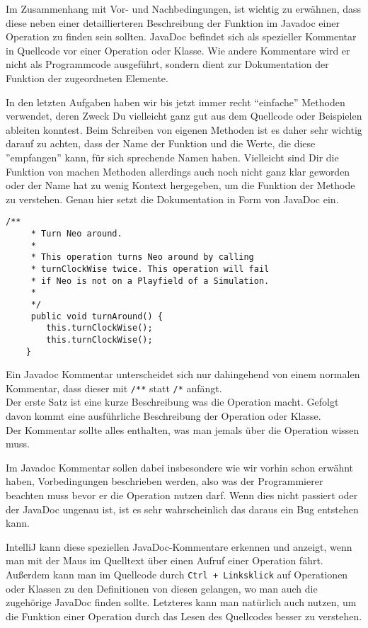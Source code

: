 \begin{Infobox}[JavaDoc]
    Im Zusammenhang mit Vor- und Nachbedingungen, ist wichtig zu erwähnen, dass diese neben einer detaillierteren Beschreibung der Funktion im Javadoc einer Operation zu finden sein sollten.
JavaDoc befindet sich als spezieller Kommentar in Quellcode vor einer Operation oder Klasse.
Wie andere Kommentare wird er nicht als Programmcode ausgeführt, sondern dient zur Dokumentation der Funktion der zugeordneten Elemente.

In den letzten Aufgaben haben wir bis jetzt immer recht \enquote{einfache} Methoden verwendet, deren Zweck Du vielleicht ganz gut aus dem Quellcode oder Beispielen ableiten konntest.
Beim Schreiben von eigenen Methoden ist es daher sehr wichtig darauf zu achten, dass der Name der Funktion und die Werte, die diese ''empfangen'' kann, für sich sprechende Namen haben.
Vielleicht sind Dir die Funktion von machen Methoden allerdings auch noch nicht ganz klar geworden oder der Name hat zu wenig Kontext hergegeben, um die Funktion der Methode
zu verstehen.
Genau hier setzt die Dokumentation in Form von JavaDoc ein.

    \begin{lstlisting}[numbers=none]
    /**
     * Turn Neo around.
     *
     * This operation turns Neo around by calling
     * turnClockWise twice. This operation will fail 
     * if Neo is not on a Playfield of a Simulation.
     *
     */
     public void turnAround() {
        this.turnClockWise();
        this.turnClockWise();
    }
    \end{lstlisting}

    Ein Javadoc Kommentar unterscheidet sich nur dahingehend von einem normalen Kommentar, dass dieser mit \lstinline{/**} statt \lstinline{/*} anfängt.\\

Der erste Satz ist eine kurze Beschreibung was die Operation macht.
Gefolgt davon kommt eine ausführliche Beschreibung der Operation oder Klasse.\\

Der Kommentar sollte alles enthalten, was man jemals über die Operation wissen muss.

Im Javadoc Kommentar sollen dabei insbesondere wie wir vorhin schon erwähnt haben, Vorbedingungen beschrieben werden, also was der Programmierer beachten muss bevor er die Operation nutzen darf.
Wenn dies nicht passiert oder der JavaDoc ungenau ist, ist es sehr wahrscheinlich das daraus ein Bug entstehen kann.

IntelliJ kann diese speziellen JavaDoc-Kommentare erkennen und anzeigt, wenn man mit der Maus im Quelltext über einen Aufruf einer Operation fährt.
Außerdem kann man im Quellcode durch \lstinline{Ctrl + Linksklick} auf Operationen oder Klassen zu den Definitionen von diesen gelangen, wo man auch die zugehörige JavaDoc finden sollte.
Letzteres kann man natürlich auch nutzen, um die Funktion einer Operation durch das Lesen des Quellcodes besser zu verstehen.
\end{Infobox}


